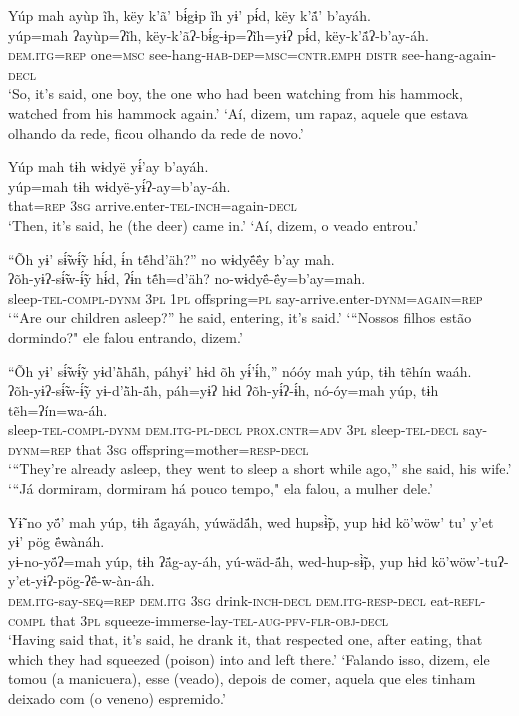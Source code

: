 \documentclass[output=paper,
modfonts,nonflat
]{langsci/langscibook}
\begin{document}
\newpage
\ea  Yúp mah ayùp ĩh, këy k’ã’ bɨ́gɨp ĩh yɨ’ pɨ́d, këy k’ã́’ b’ayáh.\\ 
\gll yúp=mah ʔayùp=ʔĩh, këy-k’ãʔ-bɨ́g-ɨp=ʔĩh=yɨʔ pɨ́d, këy-k’ã́ʔ-b’ay-áh.\\
     \textsc{dem.itg=rep} one\textsc{=msc} see-hang\textsc{-hab-dep=msc=cntr.emph} \textsc{distr} see-hang-again\textsc{-decl}\\
\glt ‘So, it’s said, one boy, the one who had been watching from his hammock, watched from his hammock again.'
\glt ‘Aí, dizem, um rapaz, aquele que estava olhando da rede, ficou olhando da rede de novo.'
\z 

\ea  Yúp mah tɨh wɨdyë yɨ́’ay b’ayáh.\\ 
\gll yúp=mah tɨh wɨdyë-yɨ́ʔ-ay=b’ay-áh.\\
     that\textsc{=rep} \textsc{3sg} arrive.enter\textsc{-tel-inch}=again\textsc{-decl}\\
\glt ‘Then, it's said, he (the deer) came in.'
\glt ‘Aí, dizem, o veado entrou.'
\z 

\ea  “Õh yɨ’ sɨ̃́wɨ̃́y hɨ́d, ɨ́n tẽ́hd’äh?” no wɨdyë́ë́y b’ay mah.\\ 
\gll ʔõh-yɨʔ-sɨ̃́w-ɨ̃́y hɨ́d, ʔɨ́n tẽ́h=d’äh? no-wɨdyë́-ë́y=b’ay=mah.\\
     sleep\textsc{-tel-compl-dynm} \textsc{3pl} \textsc{1pl} offspring\textsc{=pl} say-arrive.enter\textsc{-dynm=again=rep}\\
\glt ‘“Are our children asleep?” he said, entering, it’s said.'
\glt ‘“Nossos filhos estão dormindo?" ele falou entrando, dizem.'
\z 

\ea  “Õh yɨ’ sɨ̃́wɨ̃́y yɨd’ä̀hä́h, páhyɨ’ hɨd õh yɨ́’ɨ́h,” nóóy mah yúp, tɨh tẽhín waáh.\\ 
\gll ʔõh-yɨʔ-sɨ̃́w-ɨ̃́y yɨ-d’ä̀h-ä́h, páh=yɨʔ hɨd ʔõh-yɨ́ʔ-ɨ́h, nó-óy=mah yúp, tɨh tẽh=ʔín=wa-áh.\\
     sleep\textsc{-tel-compl-dynm} \textsc{dem.itg-pl-decl} \textsc{prox.cntr=adv} \textsc{3pl} sleep\textsc{-tel-decl} say\textsc{-dynm=rep} that \textsc{3sg} offspring=mother\textsc{=resp-decl}\\
\glt ‘“They’re already asleep, they went to sleep a short while ago,” she said, his wife.'
\glt ‘“Já dormiram, dormiram há pouco tempo," ela falou, a mulher dele.'
\z 

\newpage
\ea  Yɨ̃ no yö́’ mah yúp, tɨh ä́gayáh, yúwädä́h, wed hupsɨ̃̀p, yup hɨd kö’wöw’ tu’ y’et yɨ’ pög ë́wànáh.\\ 
\gll yɨ-no-yö́ʔ=mah yúp, tɨh ʔä́g-ay-áh, yú-wäd-ä́h, wed-hup-sɨ̃̀p, yup hɨd kö’wöw’-tuʔ-y’et-yɨʔ-pög-ʔë́-w-àn-áh.\\
     \textsc{dem.itg-}say\textsc{-seq=rep} \textsc{dem.itg} \textsc{3sg} drink\textsc{-inch-decl} \textsc{dem.itg-resp-decl} eat\textsc{-refl-compl} that \textsc{3pl} squeeze-immerse-lay\textsc{-tel-aug-pfv-flr-obj-decl}\\
\glt ‘Having said that, it’s said, he drank it, that respected one, after eating, that which they had squeezed (poison) into and left there.' 
\glt ‘Falando isso, dizem, ele tomou (a manicuera), esse (veado), depois de comer, aquela que eles tinham deixado com (o veneno) espremido.'
\z 
\end{document}
